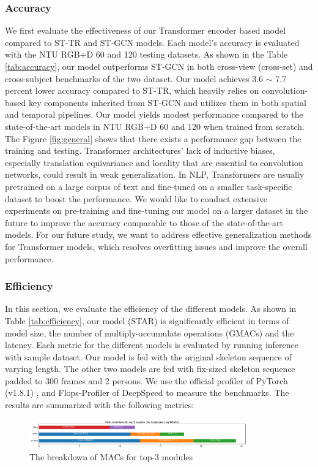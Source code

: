 \documentclass[letterpaper]{article} %
\begin{document}
\subsubsection{Accuracy}
We first evaluate the effectiveness of our Transformer encoder based model compared to ST-TR and ST-GCN models. Each model's accuracy is evaluated with the NTU RGB+D 60 and 120 testing datasets. As shown in the Table \ref{tab:accuracy}, our model outperforms ST-GCN in both cross-view (cross-set) and cross-subject benchmarks of the two dataset. Our model achieves 3.6 $\sim$ 7.7 percent lower accuracy compared to ST-TR, which heavily relies on convolution-based key components inherited from ST-GCN and utilizes them in both spatial and temporal pipelines. Our model yields modest performance compared to the state-of-the-art models in NTU RGB+D 60 and 120 when trained from scratch. The Figure \ref{fig:general} shows that there exists a performance gap between the training and testing. Transformer architectures' lack of inductive biases, especially translation equivariance and locality that are essential to convolution networks, could result in weak generalization. In NLP, Transformers are usually pretrained on a large corpus of text and fine-tuned on a smaller task-specific dataset to boost the performance. We would like to conduct extensive experiments on pre-training and fine-tuning our model on a larger dataset in the future to improve the accuracy comparable to those of the state-of-the-art models. For our future study, we want to address effective generalization methods for Transformer models, which resolves overfitting issues and improve the overall performance.

\subsubsection{Efficiency} 
In this section, we evaluate the efficiency of the different models. As shown in Table \ref{tab:efficiency}, our model (STAR) is significantly efficient in terms of model size, the number of multiply-accumulate operations (GMACs) and the latency. Each metric for the different models is evaluated by running inference with sample dataset. Our model is fed with the original skeleton sequence of varying length. The other two models are fed with fix-sized skeleton sequence padded to 300 frames and 2 persons. We use the official profiler of PyTorch (v1.8.1) \cite{pytorch}, and Flops-Profiler of DeepSpeed \cite{deepspeed2020kdd} to measure the benchmarks. The results are summarized with the following metrics:
\begin{figure}[h!]
    \centering
    \includegraphics[width=0.84\textwidth]{mac_breakdown.pdf}
    \caption{The breakdown of MACs for top-3 modules}
    \label{fig:mac_breakdown}
\end{figure}
\end{document}
